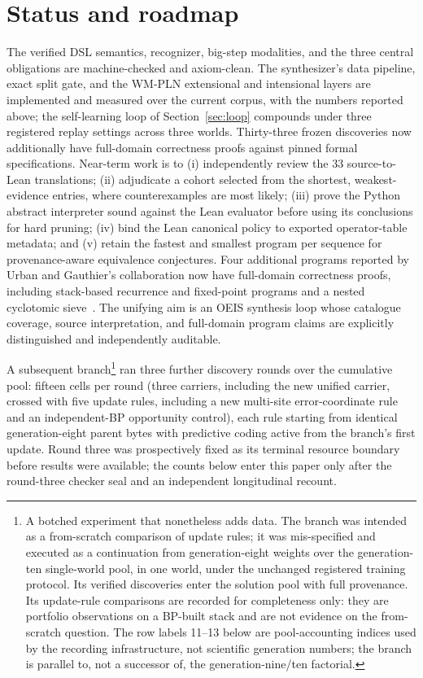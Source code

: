 \documentclass[11pt]{article}
\begin{document}
\section{Status and roadmap}
\label{sec:roadmap}

The verified DSL semantics, recognizer, big-step modalities, and the three central obligations
are machine-checked and axiom-clean. The synthesizer's data pipeline, exact split gate, and
the WM-PLN extensional and intensional layers are implemented and measured over the current
corpus, with the numbers reported above; the self-learning loop of Section~\ref{sec:loop}
compounds under three registered replay settings across three worlds. Thirty-three frozen
discoveries now additionally have full-domain correctness proofs against pinned formal
specifications. Near-term work is to (i) independently review the 33 source-to-Lean
translations; (ii) adjudicate a cohort selected from the shortest, weakest-evidence entries,
where counterexamples are most likely; (iii) prove the Python abstract interpreter sound
against the Lean evaluator before using its conclusions for hard pruning; (iv) bind the
Lean canonical policy to exported operator-table metadata; and (v) retain the fastest and
smallest program per sequence for provenance-aware equivalence conjectures. Four additional
programs reported by Urban and Gauthier's collaboration now have full-domain correctness
proofs, including stack-based recurrence and fixed-point programs and a nested cyclotomic
sieve~\cite{urban2026slides}. The unifying
aim is an OEIS synthesis loop whose catalogue coverage, source interpretation, and
full-domain program claims are explicitly distinguished and independently auditable.

A subsequent branch\footnote{A botched experiment that nonetheless adds data. The
branch was intended as a from-scratch comparison of update rules; it was
mis-specified and executed as a continuation from generation-eight weights over the
generation-ten single-world pool, in one world, under the unchanged registered
training protocol. Its verified discoveries enter the solution pool with full
provenance. Its update-rule comparisons are recorded for completeness only: they are
portfolio observations on a BP-built stack and are not evidence on the from-scratch
question. The row labels 11--13 below are pool-accounting indices used by the
recording infrastructure, not scientific generation numbers; the branch is parallel
to, not a successor of, the generation-nine/ten factorial.} ran three further
discovery rounds over the cumulative pool: fifteen cells per round (three carriers,
including the new unified carrier, crossed with five update rules, including a new
multi-site error-coordinate rule and an independent-BP opportunity control), each
rule starting from identical generation-eight parent bytes with predictive coding
active from the branch's first update. Round three was prospectively fixed as its
terminal resource boundary before results were available; the counts below enter
this paper only after the round-three checker seal and an independent longitudinal
recount.
\end{document}
